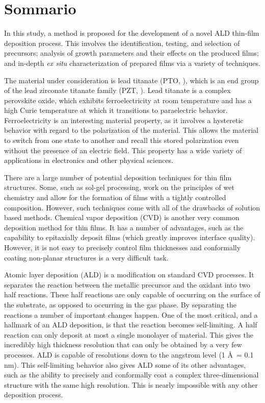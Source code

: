 \newpage
\chapter*{Sommario}



In this study, a method is proposed for the development of a novel ALD thin-film deposition process. This involves the identification, testing, and selection of precursors; analysis of growth parameters and their effects on the produced films; and in-depth \emph{ex situ} characterization of prepared films via a variety of techniques. 

The material under consideration is lead titanate (PTO, \PTO{}), which is an end group of the lead zirconate titanate family (PZT, \PZT{}). Lead titanate is a complex perovskite oxide, which exhibits ferroelectricity at room temperature and has a high Curie temperature at which it transitions to paraelectric behavior. Ferroelectricity is an interesting material property, as it involves a hysteretic behavior with regard to the polarization of the material. This allows the material to switch from one state to another and recall this stored polarization even without the presence of an electric field. This property has a wide variety of applications in electronics and other physical sciences. 

There are a large number of potential deposition techniques for thin film structures. Some, such as sol-gel processing, work on the principles of wet chemistry and allow for the formation of films with a tightly controlled composition. However, such techniques come with all of the drawbacks of solution based methods. Chemical vapor deposition (CVD) is another very common deposition method for thin films. It has a number of advantages, such as the capability to epitaxially deposit films (which greatly improves interface quality). However, it is not easy to precisely control film thicknesses and conformally coating non-planar structures is a very difficult task. 

Atomic layer deposition (ALD) is a modification on standard CVD processes. It separates the reaction between the metallic precursor and the oxidant into two half reactions. These half reactions are only capable of occurring on the surface of the substrate, as opposed to occurring in the gas phase. By separating the reactions a number of important changes happen. One of the most critical, and a hallmark of an ALD deposition, is that the reaction becomes self-limiting. A half reaction can only deposit at most a single monolayer of material. This gives the incredibly high thickness resolution that can only be obtained by a very few processes. ALD is capable of resolutions down to the angstrom level (1 \AA\ = 0.1 nm). This self-limiting behavior also gives ALD some of its other advantages, such as the ability to precisely and conformally coat a complex three-dimensional structure with the same high resolution. This is nearly impossible with any other deposition process. 

